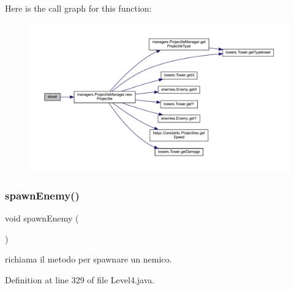 Here is the call graph for this function\+:
\nopagebreak
\begin{figure}[H]
\begin{center}
\leavevmode
\includegraphics[width=350pt]{classscenes_1_1_level4_a200b073564fc341f34b6112718742bae_cgraph}
\end{center}
\end{figure}
\mbox{\label{classscenes_1_1_level4_addfc0c3129b6ff606f7276e175f31a15}} 
\subsubsection{\texorpdfstring{spawn\+Enemy()}{spawnEnemy()}}
{\footnotesize\ttfamily void spawn\+Enemy (\begin{DoxyParamCaption}{ }\end{DoxyParamCaption})\hspace{0.3cm}{\ttfamily [private]}}



richiama il metodo per spawnare un nemico. 



Definition at line 329 of file Level4.\+java.

